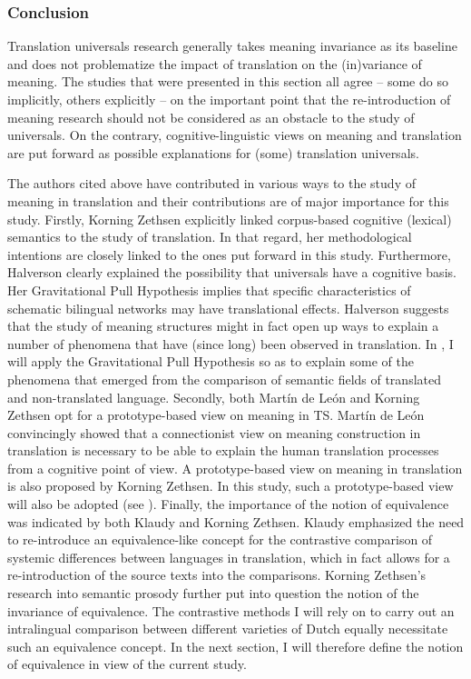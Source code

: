 \subsubsection{\label{sec:2.2.3.3}  Conclusion}

Translation universals research generally takes meaning invariance as its baseline and does not problematize the impact of translation on the (in)variance of meaning. The studies that were presented in this section all agree – some do so implicitly, others explicitly – on the important point that the re-introduction of meaning research should not be considered as an obstacle to the study of universals. On the contrary, cognitive-linguistic views on meaning and translation are put forward as possible explanations for (some) translation universals. 



The authors cited above have contributed in various ways to the study of meaning in translation and their contributions are of major importance for this study. Firstly, Korning Zethsen explicitly linked corpus-based cognitive (lexical) semantics to the study of translation. In that regard, her methodological intentions are closely linked to the ones put forward in this study. Furthermore, Halverson clearly explained the possibility that universals have a cognitive basis. Her Gravitational Pull Hypothesis implies that specific characteristics of schematic bilingual networks may have translational effects. Halverson suggests that the study of meaning structures might in fact open up ways to explain a number of phenomena that have (since long) been observed in translation. In , I will apply the Gravitational Pull Hypothesis so as to explain some of the phenomena that emerged from the comparison of semantic fields of translated and non-translated language. Secondly, both Martín de León and Korning Zethsen opt for a prototype-based view on meaning in TS. Martín de León convincingly showed that a connectionist view on meaning construction in translation is necessary to be able to explain the human translation processes from a cognitive point of view. A prototype-based view on meaning in translation is also proposed by Korning Zethsen. In this study, such a prototype-based view will also be adopted (see ). Finally, the importance of the notion of equivalence was indicated by both Klaudy and Korning Zethsen. Klaudy emphasized the need to re-introduce an equivalence-like concept for the contrastive comparison of systemic differences between languages in translation, which in fact allows for a re-introduction of the source texts into the comparisons. Korning Zethsen’s research into semantic prosody further put into question the notion of the invariance of equivalence. The contrastive methods I will rely on to carry out an intralingual comparison between different varieties of Dutch equally necessitate such an equivalence concept. In the next section, I will therefore define the notion of equivalence in view of the current study.


